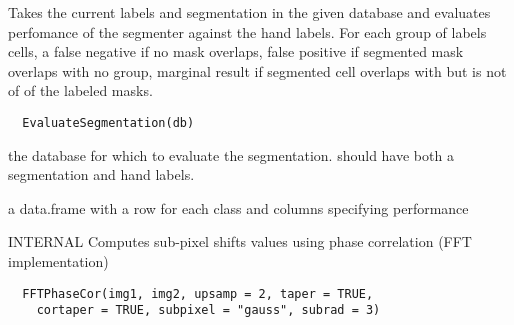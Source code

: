 \documentclass[a4paper]{book}
\begin{document}
%
\begin{Description}\relax
Takes the current labels and segmentation in the given
database and evaluates perfomance of the segmenter
against the hand labels. For each group of labels cells,
a false negative if no mask overlaps, false positive if
segmented mask overlaps with no group, marginal result if
segmented cell overlaps with but is not of of the labeled
masks.
\end{Description}
%
\begin{Usage}
\begin{verbatim}
  EvaluateSegmentation(db)
\end{verbatim}
\end{Usage}
%
\begin{Arguments}
\begin{ldescription}
\item[\code{db}] the database for which to evaluate the
segmentation.  should have both a segmentation and hand
labels.
\end{ldescription}
\end{Arguments}
%
\begin{Value}
a data.frame with a row for each class and columns
specifying performance
\end{Value}
%
\begin{Description}\relax
INTERNAL Computes sub-pixel shifts values using phase
correlation (FFT implementation)
\end{Description}
%
\begin{Usage}
\begin{verbatim}
  FFTPhaseCor(img1, img2, upsamp = 2, taper = TRUE,
    cortaper = TRUE, subpixel = "gauss", subrad = 3)
\end{verbatim}
\end{Usage}
%
\end{document}
